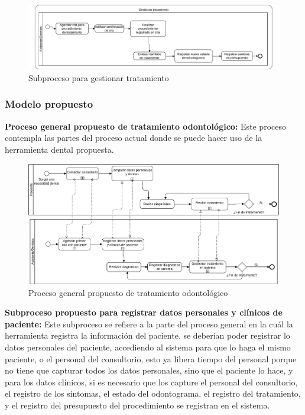 \begin{figure}[H]
\centering
\centerline{\includegraphics[width=\textwidth, keepaspectratio]{pictures/picture10.pdf}}
\caption{Subproceso para gestionar tratamiento}
\end{figure}

\subsubsection{Modelo propuesto}

\noindent\textbf{Proceso general propuesto de tratamiento odontológico:} Este proceso contempla las partes del proceso actual donde se puede hacer uso de la herramienta dental propuesta.

\begin{figure}[H]
\centering
\centerline{\includegraphics[width=18.5cm, keepaspectratio]{pictures/picture11.pdf}}
\caption{Proceso general propuesto de tratamiento odontológico}
\end{figure}


\noindent\textbf{Subproceso propuesto para registrar datos personales y clínicos de paciente:} Este subproceso se refiere a la parte del proceso general en la cuál la herramienta registra la información del paciente, se deberían poder registrar lo datos personales del paciente, accediendo al sistema para que lo haga el mismo paciente, o el personal del consultorio, esto ya libera tiempo del personal porque no tiene que capturar todos los datos personales, sino que el paciente lo hace, y para los datos clínicos, si es necesario que los capture el personal del consultorio, el registro de los síntomas, el estado del odontograma, el registro del tratamiento, y el registro del presupuesto del procedimiento se registran en el sistema.

